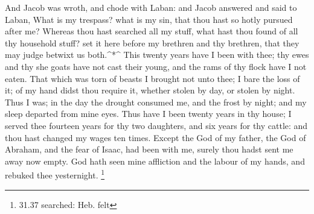  And Jacob was wroth, and chode with Laban: and Jacob
answered and said to Laban, What is my trespass? what is my sin, that
thou hast so hotly pursued after me?  Whereas thou hast
searched all my stuff, what hast thou found of all thy household stuff?
set it here before my brethren and thy brethren, that they may judge
betwixt us both.\^{}*\^{}  This twenty years have I been
with thee; thy ewes and thy she goats have not cast their young, and the
rams of thy flock have I not eaten.  That which was torn of
beasts I brought not unto thee; I bare the loss of it; of my hand didst
thou require it, whether stolen by day, or stolen by night.
 Thus I was; in the day the drought consumed me, and the
frost by night; and my sleep departed from mine eyes.  Thus
have I been twenty years in thy house; I served thee fourteen years for
thy two daughters, and six years for thy cattle: and thou hast changed
my wages ten times.  Except the God of my father, the God
of Abraham, and the fear of Isaac, had been with me, surely thou hadst
sent me away now empty. God hath seen mine affliction and the labour of
my hands, and rebuked thee yesternight. \footnote{31.37 searched: Heb.
  felt}

